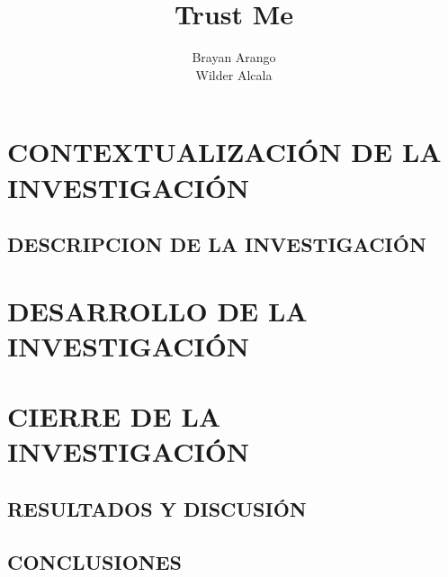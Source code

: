 \documentclass[12pt,letterpaper,oneside]{report}
\title{Trust Me}
\author{{Brayan Arango} \\ {Wilder Alcala}}
\begin{document}
	
	
	

	
	
	
	\tableofcontents
	\listoffigures
	
	
	
	\part{CONTEXTUALIZACIÓN DE LA INVESTIGACIÓN}
	
		\chapter{DESCRIPCION DE LA INVESTIGACIÓN}
			
			
			
			
			
			
			
			
	\part{DESARROLLO DE LA INVESTIGACIÓN}

			

	\part{CIERRE DE LA INVESTIGACIÓN}

		\chapter*{RESULTADOS Y DISCUSIÓN}
			

		\chapter*{CONCLUSIONES}
			
			
			
			
\end{document}
